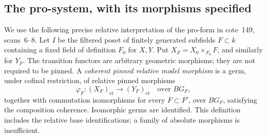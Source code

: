\documentclass[11pt]{article}
\begin{document}
\subsection{The pro-system, with its morphisms specified}

We use the following precise relative interpretation of the
pro-form in cote~149, scans~6--8. Let \(I\) be the filtered poset
of finitely generated subfields \(F\subset k\) containing a fixed
field of definition \(F_0\) for \(X,Y\). Put
\(X_F=X_0\times_{F_0}F\), and similarly for \(Y_F\).
The transition functors are arbitrary geometric morphisms; they
are not required to be pinned. A \emph{coherent pinned relative
model morphism} is a germ, under cofinal restriction, of relative
pinned morphisms
\[
       \varphi_F:(X_F)_{\mathrm{et}}\longrightarrow
                         (Y_F)_{\mathrm{et}}
                  \quad\text{over }BG_F,
\]
together with commutation isomorphisms for every \(F\subset F'\),
over \(BG_F\), satisfying the composition coherence. Isomorphic
germs are identified. This definition includes the relative base
identifications; a family of absolute morphisms is insufficient.
\end{document}
